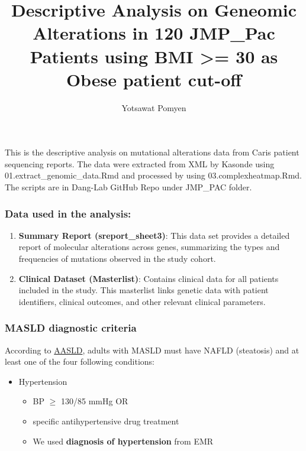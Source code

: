 \documentclass[
]{article}
\title{Descriptive Analysis on Geneomic Alterations in 120 JMP\_Pac
Patients using BMI \textgreater= 30 as Obese patient cut-off}
\author{Yotsawat Pomyen}
\date{}
\providecommand{\tightlist}{%
  \setlength{\itemsep}{0pt}\setlength{\parskip}{0pt}}
\begin{document}
\maketitle

This is the descriptive analysis on mutational alterations data from
Caris patient sequencing reports. The data were extracted from XML by
Kasonde using 01.extract\_genomic\_data.Rmd and processed by using
03.complexheatmap.Rmd. The scripts are in Dang-Lab GitHub Repo under
JMP\_PAC folder.

\hypertarget{data-used-in-the-analysis}{%
\subsubsection{Data used in the
analysis:}\label{data-used-in-the-analysis}}

\begin{enumerate}
\def\labelenumi{\arabic{enumi}.}
\item
  \textbf{Summary Report (sreport\_sheet3)}: This data set provides a
  detailed report of molecular alterations across genes, summarizing the
  types and frequencies of mutations observed in the study cohort.
\item
  \textbf{Clinical Dataset (Masterlist)}: Contains clinical data for all
  patients included in the study. This masterlist links genetic data
  with patient identifiers, clinical outcomes, and other relevant
  clinical parameters.
\end{enumerate}

\hypertarget{masld-diagnostic-criteria}{%
\subsubsection{MASLD diagnostic
criteria}\label{masld-diagnostic-criteria}}

According to \href{https://www.aasld.org/new-masld-nomenclature}{AASLD},
adults with MASLD must have NAFLD (steatosis) and at least one of the
four following conditions:

\begin{itemize}
\tightlist
\item
  Hypertension

  \begin{itemize}
  \tightlist
  \item
    BP \(\ge\) 130/85 mmHg OR
  \item
    specific antihypertensive drug treatment
  \item
    We used \textbf{diagnosis of hypertension} from EMR
  \end{itemize}
\end{itemize}
\end{document}
